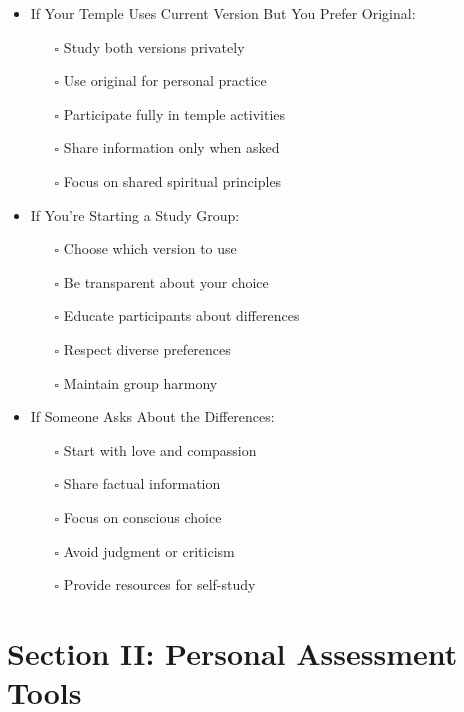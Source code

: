 \documentclass[11pt,twoside]{book}
\begin{document}
\begin{itemize}
\begin{itemize}
\item If Your Temple Uses Current Version But You Prefer Original:
\label{sec:org93a56d6}
\begin{itemize}
\item[{$\square$}] Study both versions privately
\item[{$\square$}] Use original for personal practice
\item[{$\square$}] Participate fully in temple activities
\item[{$\square$}] Share information only when asked
\item[{$\square$}] Focus on shared spiritual principles
\end{itemize}
\item If You're Starting a Study Group:
\label{sec:org2a9094a}
\begin{itemize}
\item[{$\square$}] Choose which version to use
\item[{$\square$}] Be transparent about your choice
\item[{$\square$}] Educate participants about differences
\item[{$\square$}] Respect diverse preferences
\item[{$\square$}] Maintain group harmony
\end{itemize}
\item If Someone Asks About the Differences:
\label{sec:org99d4c89}
\begin{itemize}
\item[{$\square$}] Start with love and compassion
\item[{$\square$}] Share factual information
\item[{$\square$}] Focus on conscious choice
\item[{$\square$}] Avoid judgment or criticism
\item[{$\square$}] Provide resources for self-study
\end{itemize}
\end{itemize}
\end{itemize}
\section*{Section II: Personal Assessment Tools}
\label{sec:orgf277675}
\end{document}

